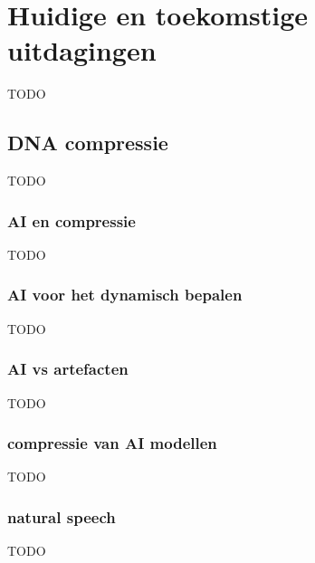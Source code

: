 \chapter{Huidige en toekomstige uitdagingen}
\label{ch:uitdagingen}

TODO

\section{DNA compressie}
\label{sec:uitdagingen-dna-compressie}

TODO

\subsection{AI en compressie}
\label{sec:uitdagingen-ai}

TODO

\subsection{AI voor het dynamisch bepalen}
\label{sec:uitdagingen-ai-dynamisch-bepalen}

TODO

\subsection{AI vs artefacten}
\label{sec:uitdagingen-ai-vs-artefacten}

TODO

\subsection{compressie van AI modellen}
\label{sec:uitdagingen-ai-models}

TODO

\subsection{natural speech}
\label{sec:uitdagingen-ai-speech}

TODO
